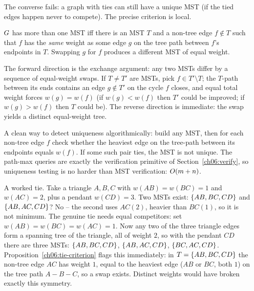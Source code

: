 The converse fails: a graph with ties can still have a unique MST (if the tied edges happen never to compete). The precise criterion is local.

\begin{proposition}
\label{ch06:tie-criterion}
$G$ has more than one MST iff there is an MST $T$ and a non-tree edge $f\notin T$ such that $f$ has the \emph{same} weight as some edge $g$ on the tree path between $f$'s endpoints in $T$. Swapping $g$ for $f$ produces a different MST of equal weight.
\end{proposition}

\begin{whybox}
The forward direction is the exchange argument: any two MSTs differ by a sequence of equal-weight swaps. If $T\ne T'$ are MSTs, pick $f\in T'\setminus T$; the $T$-path between its ends contains an edge $g\notin T'$ on the cycle $f$ closes, and equal total weight forces $w(g)=w(f)$ (if $w(g)<w(f)$ then $T'$ could be improved; if $w(g)>w(f)$ then $T$ could be). The reverse direction is immediate: the swap yields a distinct equal-weight tree.
\end{whybox}

\begin{remark}
A clean way to detect uniqueness algorithmically: build any MST, then for each non-tree edge $f$ check whether the heaviest edge on the tree-path between its endpoints equals $w(f)$. If some such pair ties, the MST is not unique. The path-max queries are exactly the verification primitive of Section~\ref{ch06:verify}, so uniqueness testing is no harder than MST verification: $O(m+n)$.
\end{remark}

\begin{labbox}
A worked tie. Take a triangle $A,B,C$ with $w(AB)=w(BC)=1$ and $w(AC)=2$, plus a pendant $w(CD)=3$. Two MSTs exist: $\{AB,BC,CD\}$ and $\{AB,AC,CD\}$? No -- the second uses $AC(2)$, heavier than $BC(1)$, so it is not minimum. The genuine tie needs equal competitors: set $w(AB)=w(BC)=w(AC)=1$. Now any two of the three triangle edges form a spanning tree of the triangle, all of weight $2$, so with the pendant $CD$ there are three MSTs: $\{AB,BC,CD\}$, $\{AB,AC,CD\}$, $\{BC,AC,CD\}$. Proposition~\ref{ch06:tie-criterion} flags this immediately: in $T=\{AB,BC,CD\}$ the non-tree edge $AC$ has weight $1$, equal to the heaviest edge ($AB$ or $BC$, both $1$) on the tree path $A\!-\!B\!-\!C$, so a swap exists. Distinct weights would have broken exactly this symmetry.
\end{labbox}

